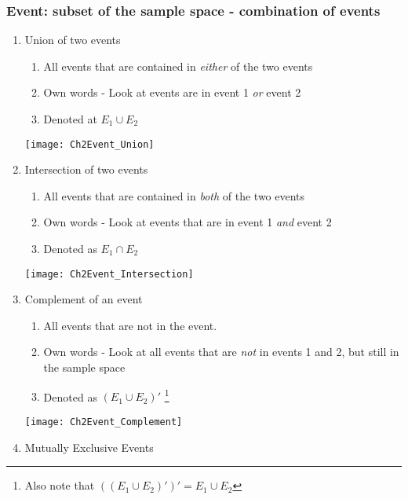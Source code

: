 \documentclass[../IND E 315.tex]{subfiles}
\begin{document}
\subsubsection*{Event: subset of the sample space - combination of events}
\begin{enumerate}
    \item Union of two events
        \begin{enumerate}
            \item All events that are contained in \emph{either} of the two events
            \item Own words - Look at events are in event 1 \emph{or} event 2
            \item Denoted at $E_1 \cup E_2$
        \end{enumerate}
        \begin{center}
            \texttt{[image: Ch2Event\_Union]}
        \end{center}
    \item Intersection of two events
        \begin{enumerate}
            \item All events that are contained in \emph{both} of the two events
            \item Own words - Look at events that are in event 1 \emph{and} event 2
            \item Denoted as $E_1 \cap E_2$
        \end{enumerate}
        \begin{center}
            \texttt{[image: Ch2Event\_Intersection]}
        \end{center}
    \item Complement of an event
        \begin{enumerate}
            \item All events that are not in the event.
            \item Own words - Look at all events that are \emph{not} in events 1 and 2, but still in the sample space
            \item Denoted as $(E_1 \cup E_2)'$ \footnote{Also note that $((E_1 \cup E_2)')' = E_1 \cup E_2$}
        \end{enumerate}
        \begin{center}
            \texttt{[image: Ch2Event\_Complement]}
        \end{center}
    \item Mutually Exclusive Events

\end{enumerate}
\end{document}
